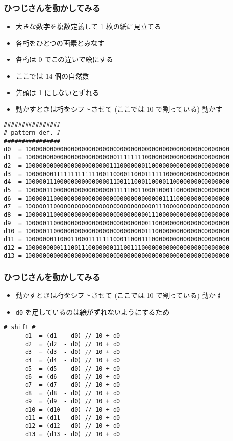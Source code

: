 \begin{frame}
\frametitle{ひつじさんを動かしてみる}
  \begin{itemize}
\scriptsize
\item 大きな数字を複数定義して 1 枚の紙に見立てる
\item 各桁をひとつの画素とみなす
\item 各桁は 0 でこの違いで絵にする
\item ここでは 14 個の自然数
\item 先頭は 1 にしないとずれる
\item 動かすときは桁をシフトさせて (ここでは 10 で割っている) 動かす
  \end{itemize}
  \begin{lstlisting}[caption={sheep.py (declaration)},label=sheep-data]
################
# pattern def. #
################
d0  = 1000000000000000000000000000000000000000000000000000000000
d1  = 1000000000000000000000000011111111000000000000000000000000
d2  = 1000000000000000000000001110000000110000000000000000000000
d3  = 1000000011111111111110011000011000111111000000000000000000
d4  = 1000001110000000000000001100111000110000110000000000000000
d5  = 1000001100000000000000000111110011000100011000000000000000
d6  = 1000001100000000000000000000000000000001111000000000000000
d7  = 1000001100000000000000000000000000000111000000000000000000
d8  = 1000001100000000000000000000000000011100000000000000000000
d9  = 1000001100000000000000000000000000011000000000000000000000
d10 = 1000001100000000000000000000000000111000000000000000000000
d11 = 1000000011000110001111111000110001110000000000000000000000
d12 = 1000000000111001110000000111001110000000000000000000000000
d13 = 1000000000000000000000000000000000000000000000000000000000
  \end{lstlisting}
\end{frame}
\begin{frame}
\frametitle{ひつじさんを動かしてみる}
  \begin{itemize}
\scriptsize
\item 動かすときは桁をシフトさせて (ここでは 10 で割っている) 動かす
\item {\tt d0} を足しているのは絵がずれないようにするため
  \end{itemize}
  \begin{lstlisting}[caption={sheep.py (shift)},label=sheep-shift,firstnumber=last]
      # shift #
      d1  = (d1 -  d0) // 10 + d0
      d2  = (d2  - d0) // 10 + d0
      d3  = (d3  - d0) // 10 + d0
      d4  = (d4  - d0) // 10 + d0
      d5  = (d5  - d0) // 10 + d0
      d6  = (d6  - d0) // 10 + d0
      d7  = (d7  - d0) // 10 + d0
      d8  = (d8  - d0) // 10 + d0
      d9  = (d9  - d0) // 10 + d0
      d10 = (d10 - d0) // 10 + d0
      d11 = (d11 - d0) // 10 + d0
      d12 = (d12 - d0) // 10 + d0
      d13 = (d13 - d0) // 10 + d0
  \end{lstlisting}
\end{frame}
